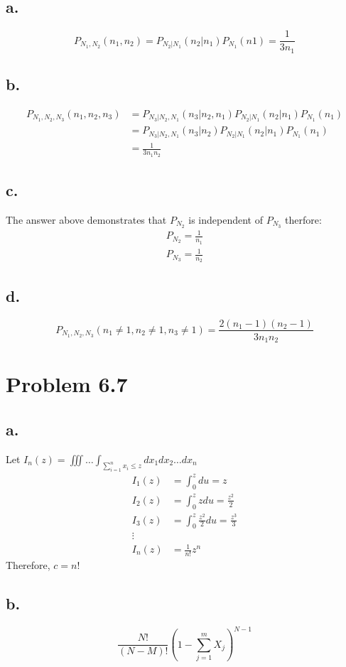 \documentclass[12pt]{article}
\begin{document}
\subsection{a.}
\[P_{N_1,N_2}(n_1,n_2) = P_{N_2|N_1}(n_2|n_1)P_{N_1}(n1) = \frac{1}{3n_1}\]

\subsection{b.}
\begin{align*}
  P_{N_1,N_2,N_3}(n_1,n_2,n_3) &= P_{N_3|N_2,N_1}(n_3|n_2,n_1)P_{N_2|N_1}(n_2|n_1)P_{N_1}(n_1) \\
  &= P_{N_3|N_2,N_1}(n_3|n_2)P_{N_2|N_1}(n_2|n_1)P_{N_1}(n_1) \\
  &= \frac{1}{3n_1n_2}
\end{align*}

\subsection{c.}
The answer above demonstrates that $P_{N_2}$ is independent of $P_{N_3}$ therfore:
\begin{align*}
  P_{N_2} = \frac{1}{n_1} \\
  P_{N_3} = \frac{1}{n_2}
\end{align*}

\subsection{d.}
\[P_{N_1,N_2,N_3}(n_1 \ne 1, n_2 \ne 1, n_3 \ne 1) = \frac{2(n_1-1)(n_2-1)}{3n_1n_2}\]
\section{Problem 6.7}
\subsection{a.}
Let $I_n(z) = \iiint \dots \int_{\sum_{i=1}^n x_i \leq z} dx_1 dx_2 \dots dx_n$
\begin{align*}
I_1(z) &= \int_{0}^z du = z \\
I_2(z) &= \int_{0}^z zdu = \frac{z^2}{2} \\
I_3(z) &= \int_{0}^z \frac{z^2}{2}du = \frac{z^3}{3} \\
\vdots \\
I_n(z) &= \frac{1}{n!}z^n
\end{align*}
Therefore, $c=n!$

\subsection{b.}
\[\frac{N!}{(N-M)!}\left( 1- \sum_{j=1}^m X_j \right)^{N-1}\]
\end{document}
